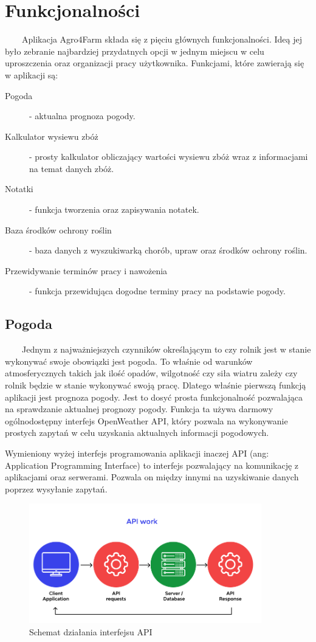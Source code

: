 \documentclass[a4paper,12pt,oneside]{book}
\begin{document}
	\section{Funkcjonalności}
	\ \ \ \
	Aplikacja Agro4Farm składa się z pięciu głównych funkcjonalności. Ideą jej było zebranie najbardziej przydatnych opcji w jednym miejscu w celu uproszczenia oraz organizacji pracy użytkownika. Funkcjami, które zawierają się w aplikacji są:
	\begin{description}
		\item[Pogoda] - aktualna prognoza pogody.
		\item[Kalkulator wysiewu zbóż] - prosty kalkulator obliczający wartości wysiewu zbóż wraz z informacjami na temat danych zbóż.
		\item[Notatki] - funkcja tworzenia oraz zapisywania notatek.
		\item[Baza środków ochrony roślin] - baza danych z wyszukiwarką chorób, upraw oraz środków ochrony roślin.
		\item[Przewidywanie terminów pracy i nawożenia] - funkcja przewidująca dogodne terminy pracy na podstawie pogody.
	\end{description}
	
	\newpage
	
	\subsection{Pogoda}
	\ \ \ \
		Jednym z najważniejszych czynników określającym to czy rolnik jest w stanie wykonywać swoje obowiązki jest pogoda. To właśnie od warunków atmosferycznych takich jak ilość opadów, wilgotność czy siła wiatru zależy czy rolnik będzie w stanie wykonywać swoją pracę. Dlatego właśnie pierwszą funkcją aplikacji jest prognoza pogody. Jest to dosyć prosta funkcjonalność pozwalająca na sprawdzanie aktualnej prognozy pogody. Funkcja ta używa darmowy ogólnodostępny interfejs OpenWeather API, który pozwala na wykonywanie prostych zapytań w celu uzyskania aktualnych informacji pogodowych. 
		
		Wymieniony wyżej interfejs programowania aplikacji inaczej API (ang: Application Programming Interface) to interfejs pozwalający na komunikację z aplikacjami oraz serwerami. Pozwala on między innymi na uzyskiwanie danych poprzez wysyłanie zapytań. 
	
	\begin{figure}[H]
		\centering
		\includegraphics[width=0.9\textwidth]{grafika/api.png}
		\caption{Schemat działania interfejsu API}
	\end{figure}
\end{document}
